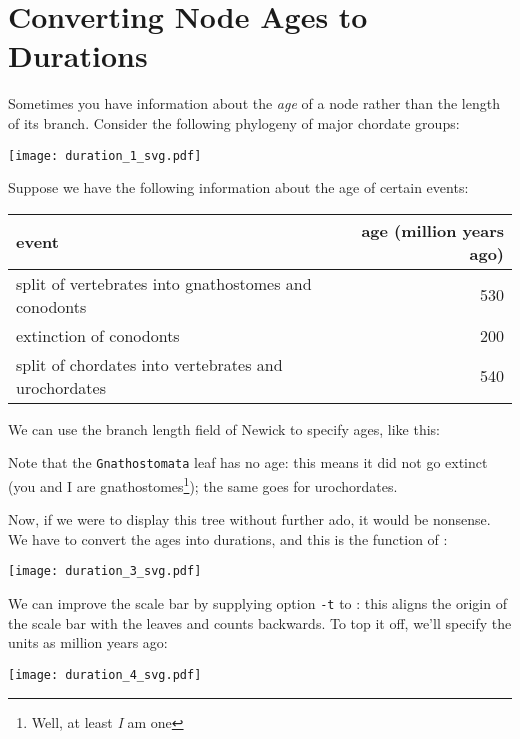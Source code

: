 \section{Converting Node Ages to Durations}
\label{sct_duration}

Sometimes you have information about the \textit{age} of a node rather than the
length of its branch. Consider the following phylogeny of major chordate groups:

\begin{center}
 \texttt{[image: duration\_1\_svg.pdf]}
\end{center}

Suppose we have the following information about the age of certain events:

\smallskip
\begin{tabular}{lr}
\textbf{event} & \textbf{age} (million years ago)\\
\hline
split of vertebrates into gnathostomes and conodonts & 530 \\
extinction of conodonts & 200 \\
split of chordates into vertebrates and urochordates & 540 \\
\end{tabular}
\smallskip

\noindent{}We can use the branch length field of Newick to specify ages, like
this:

\begin{samepage}


\end{samepage}

\noindent{}Note that the \texttt{Gnathostomata} leaf has no age: this means it
did not go extinct (you and I are gnathostomes\footnote{Well, at least \textit{I} am one}); the same goes for urochordates.

Now, if we were to display this tree without further ado, it would be nonsense.
We have to convert the ages into durations, and this is the function of
\duration{}:


\begin{center}
 \texttt{[image: duration\_3\_svg.pdf]}
\end{center}

\noindent{}We can improve the scale bar by supplying option \texttt{-t} to
\display{}: this aligns the origin of the scale bar with the leaves and counts
backwards. To top it off, we'll specify the units as million years ago:


\begin{center}
 \texttt{[image: duration\_4\_svg.pdf]}
\end{center}


